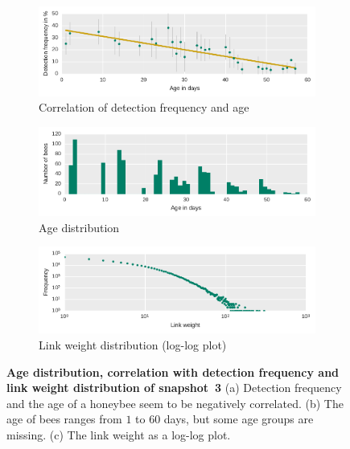 \begin{figure}[bp]
	\centering
	\begin{subfigure}[b]{1\textwidth}
	\centering
	\includegraphics[width=1.0\textwidth]{Figures/n3_detFvsAge}
	\caption[Correlation]{Correlation of detection frequency and age}
	\label{fig:n3detfVSage}
	\vspace{10mm}
	\end{subfigure} 
	\begin{subfigure}[b]{1\textwidth}
	\centering
	\includegraphics[width=1.0\textwidth]{Figures/n3_ages.pdf}
	\caption[Age distribution]{Age distribution}
	\label{fig:n3ageDist}
	\vspace{10mm}
	\end{subfigure}	\begin{subfigure}[b]{1\textwidth}
	\centering
	\includegraphics[width=1.0\textwidth]{Figures/n3-edgeWeightDist.pdf}
	\caption[Link weight distribution]{Link weight distribution (log-log plot)}
	\label{fig:edgeWdist}
	\end{subfigure}
	
	
	\caption[Age distribution, correlation with detection frequency and link weight distribution of snapshot~3]{\textbf{Age distribution, correlation with detection frequency and link weight distribution of snapshot~3} (a) Detection frequency and the age of a honeybee seem to be negatively correlated. (b) The age of bees ranges from $1$ to $60$ days, but some age groups are missing. (c) The link weight as a log-log plot.}
	\label{fig:ageDetF}
\end{figure}